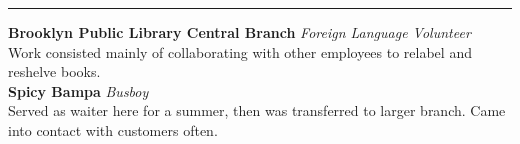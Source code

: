 \documentclass[14, .75in]{article}
\begin{document}
  \vspace{0.1cm} \hrule \vspace{0.3cm}
  \noindent\textbf{Brooklyn Public Library Central Branch}\textit{ Foreign Language Volunteer}\\
  Work consisted mainly of collaborating with other employees to relabel and reshelve books.\\
  \textbf{Spicy Bampa}\textit{ Busboy}\\
  Served as waiter here for a summer, then was transferred to larger branch. Came into contact with customers often.



\end{document}
